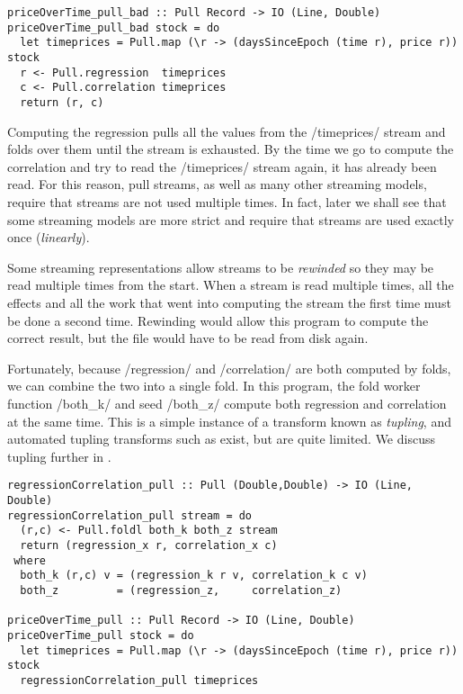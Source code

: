 \begin{lstlisting}
priceOverTime_pull_bad :: Pull Record -> IO (Line, Double)
priceOverTime_pull_bad stock = do
  let timeprices = Pull.map (\r -> (daysSinceEpoch (time r), price r)) stock
  r <- Pull.regression  timeprices
  c <- Pull.correlation timeprices
  return (r, c)
\end{lstlisting}

Computing the regression pulls all the values from the \Hs/timeprices/ stream and folds over them until the stream is exhausted.
By the time we go to compute the correlation and try to read the \Hs/timeprices/ stream again, it has already been read.
For this reason, pull streams, as well as many other streaming models, require that streams are not used multiple times.
In fact, later  we shall see that some streaming models are more strict and require that streams are used exactly once (\emph{linearly}).

Some streaming representations allow streams to be \emph{rewinded} so they may be read multiple times from the start.
When a stream is read multiple times, all the effects and all the work that went into computing the stream the first time must be done a second time.
Rewinding would allow this program to compute the correct result, but the file would have to be read from disk again.

Fortunately, because \Hs/regression/ and \Hs/correlation/ are both computed by folds, we can combine the two into a single fold.
In this program, the fold worker function \Hs/both_k/ and seed \Hs/both_z/ compute both regression and correlation at the same time.
This is a simple instance of a transform known as \emph{tupling}, and automated tupling transforms such as \cite{hu1997tupling} exist, but are quite limited.
We discuss tupling further in .

\begin{lstlisting}
regressionCorrelation_pull :: Pull (Double,Double) -> IO (Line, Double)
regressionCorrelation_pull stream = do
  (r,c) <- Pull.foldl both_k both_z stream
  return (regression_x r, correlation_x c)
 where
  both_k (r,c) v = (regression_k r v, correlation_k c v)
  both_z         = (regression_z,     correlation_z)

priceOverTime_pull :: Pull Record -> IO (Line, Double)
priceOverTime_pull stock = do
  let timeprices = Pull.map (\r -> (daysSinceEpoch (time r), price r)) stock
  regressionCorrelation_pull timeprices
\end{lstlisting}


